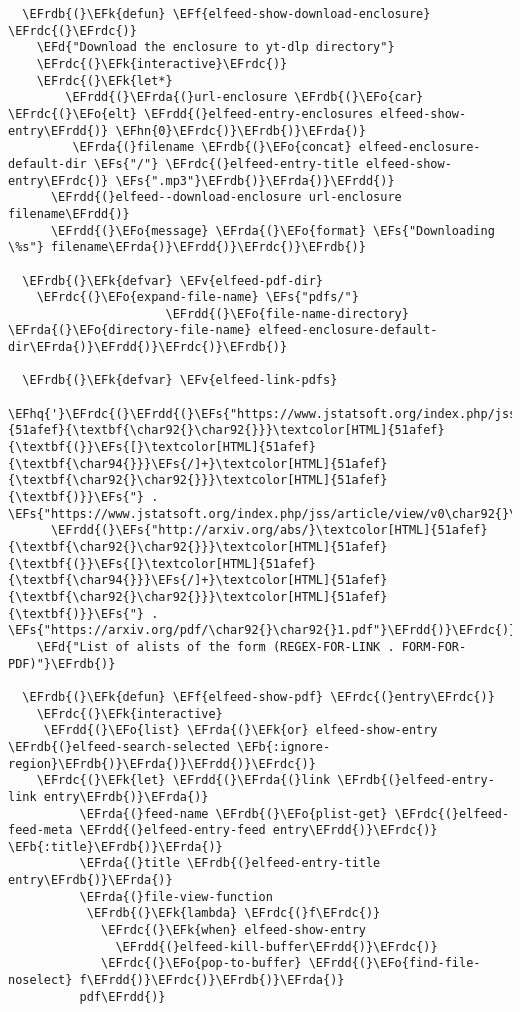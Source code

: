 \documentclass[a4wide,10pt]{article}
\newcommand{\EFs}[1]{\textcolor{EFs}{#1}} %
\newcommand{\EFd}[1]{\textcolor{EFd}{#1}} %
\newcommand{\EFk}[1]{\textcolor{EFk}{#1}} %
\newcommand{\EFb}[1]{\textcolor{EFb}{#1}} %
\newcommand{\EFf}[1]{\textcolor{EFf}{#1}} %
\newcommand{\EFv}[1]{\textcolor{EFv}{#1}} %
\newcommand{\EFo}[1]{\textcolor{EFo}{#1}} %
\newcommand{\EFhn}[1]{\textcolor{EFhn}{\textbf{#1}}} %
\newcommand{\EFhq}[1]{\textcolor{EFhq}{#1}} %
\newcommand{\EFrda}[1]{\textcolor{EFrda}{#1}} %
\newcommand{\EFrdb}[1]{\textcolor{EFrdb}{#1}} %
\newcommand{\EFrdc}[1]{\textcolor{EFrdc}{#1}} %
\newcommand{\EFrdd}[1]{\textcolor{EFrdd}{#1}} %
\begin{document}
\begin{Code}
\begin{Verbatim}
  \EFrdb{(}\EFk{defun} \EFf{elfeed-show-download-enclosure} \EFrdc{(}\EFrdc{)}
    \EFd{"Download the enclosure to yt-dlp directory"}
    \EFrdc{(}\EFk{interactive}\EFrdc{)}
    \EFrdc{(}\EFk{let*}
        \EFrdd{(}\EFrda{(}url-enclosure \EFrdb{(}\EFo{car} \EFrdc{(}\EFo{elt} \EFrdd{(}elfeed-entry-enclosures elfeed-show-entry\EFrdd{)} \EFhn{0}\EFrdc{)}\EFrdb{)}\EFrda{)}
         \EFrda{(}filename \EFrdb{(}\EFo{concat} elfeed-enclosure-default-dir \EFs{"/"} \EFrdc{(}elfeed-entry-title elfeed-show-entry\EFrdc{)} \EFs{".mp3"}\EFrdb{)}\EFrda{)}\EFrdd{)}
      \EFrdd{(}elfeed--download-enclosure url-enclosure filename\EFrdd{)}
      \EFrdd{(}\EFo{message} \EFrda{(}\EFo{format} \EFs{"Downloading \%s"} filename\EFrda{)}\EFrdd{)}\EFrdc{)}\EFrdb{)}

  \EFrdb{(}\EFk{defvar} \EFv{elfeed-pdf-dir}
    \EFrdc{(}\EFo{expand-file-name} \EFs{"pdfs/"}
                      \EFrdd{(}\EFo{file-name-directory} \EFrda{(}\EFo{directory-file-name} elfeed-enclosure-default-dir\EFrda{)}\EFrdd{)}\EFrdc{)}\EFrdb{)}

  \EFrdb{(}\EFk{defvar} \EFv{elfeed-link-pdfs}
    \EFhq{'}\EFrdc{(}\EFrdd{(}\EFs{"https://www.jstatsoft.org/index.php/jss/article/view/v0}\textcolor[HTML]{51afef}{\textbf{\char92{}\char92{}}}\textcolor[HTML]{51afef}{\textbf{(}}\EFs{[}\textcolor[HTML]{51afef}{\textbf{\char94{}}}\EFs{/]+}\textcolor[HTML]{51afef}{\textbf{\char92{}\char92{}}}\textcolor[HTML]{51afef}{\textbf{)}}\EFs{"} . \EFs{"https://www.jstatsoft.org/index.php/jss/article/view/v0\char92{}\char92{}1/v\char92{}\char92{}1.pdf"}\EFrdd{)}
      \EFrdd{(}\EFs{"http://arxiv.org/abs/}\textcolor[HTML]{51afef}{\textbf{\char92{}\char92{}}}\textcolor[HTML]{51afef}{\textbf{(}}\EFs{[}\textcolor[HTML]{51afef}{\textbf{\char94{}}}\EFs{/]+}\textcolor[HTML]{51afef}{\textbf{\char92{}\char92{}}}\textcolor[HTML]{51afef}{\textbf{)}}\EFs{"} . \EFs{"https://arxiv.org/pdf/\char92{}\char92{}1.pdf"}\EFrdd{)}\EFrdc{)}
    \EFd{"List of alists of the form (REGEX-FOR-LINK . FORM-FOR-PDF)"}\EFrdb{)}

  \EFrdb{(}\EFk{defun} \EFf{elfeed-show-pdf} \EFrdc{(}entry\EFrdc{)}
    \EFrdc{(}\EFk{interactive}
     \EFrdd{(}\EFo{list} \EFrda{(}\EFk{or} elfeed-show-entry \EFrdb{(}elfeed-search-selected \EFb{:ignore-region}\EFrdb{)}\EFrda{)}\EFrdd{)}\EFrdc{)}
    \EFrdc{(}\EFk{let} \EFrdd{(}\EFrda{(}link \EFrdb{(}elfeed-entry-link entry\EFrdb{)}\EFrda{)}
          \EFrda{(}feed-name \EFrdb{(}\EFo{plist-get} \EFrdc{(}elfeed-feed-meta \EFrdd{(}elfeed-entry-feed entry\EFrdd{)}\EFrdc{)} \EFb{:title}\EFrdb{)}\EFrda{)}
          \EFrda{(}title \EFrdb{(}elfeed-entry-title entry\EFrdb{)}\EFrda{)}
          \EFrda{(}file-view-function
           \EFrdb{(}\EFk{lambda} \EFrdc{(}f\EFrdc{)}
             \EFrdc{(}\EFk{when} elfeed-show-entry
               \EFrdd{(}elfeed-kill-buffer\EFrdd{)}\EFrdc{)}
             \EFrdc{(}\EFo{pop-to-buffer} \EFrdd{(}\EFo{find-file-noselect} f\EFrdd{)}\EFrdc{)}\EFrdb{)}\EFrda{)}
          pdf\EFrdd{)}


\end{Verbatim}
\end{Code}
\end{document}
